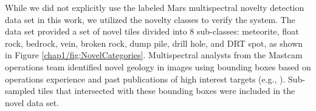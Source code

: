 While we did not explicitly use the labeled Mars multispectral novelty detection data set in this work, we utilized the novelty classes to verify the system.
The data set provided a set of novel tiles divided into 8 sub-classes: meteorite, float rock, bedrock, vein, broken rock, dump pile, drill hole, and DRT spot, as shown in Figure \ref{chap1/fig:NovelCategories}. 
Multispectral analysts from the Mastcam operations team identified novel geology in images using bounding boxes based on operations experience and past publications of high interest targets (e.g., \cite{wellington2017visible}).
Sub-sampled tiles that intersected with these bounding boxes were included in the novel data set.


